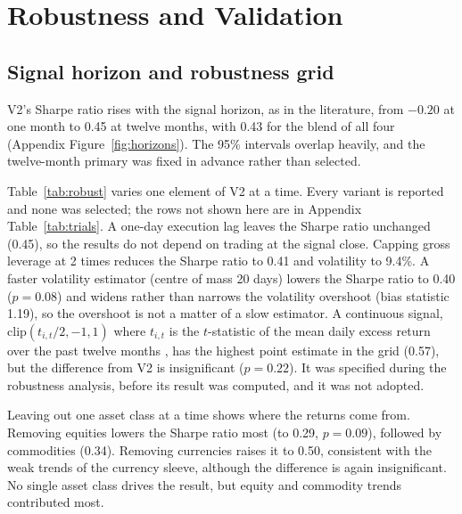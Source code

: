 \documentclass[11pt,a4paper]{article}
\begin{document}
\FloatBarrier
\section{Robustness and Validation}
\label{sec:robust}

\subsection{Signal horizon and robustness grid}

V2's Sharpe ratio rises with the signal horizon, as in the literature, from $-0.20$ at one month to 0.45 at twelve months, with 0.43 for the blend of all four (Appendix Figure~\ref{fig:horizons}). The 95\% intervals overlap heavily, and the twelve-month primary was fixed in advance rather than selected.

Table~\ref{tab:robust} varies one element of V2 at a time. Every variant is reported and none was selected; the rows not shown here are in Appendix Table~\ref{tab:trials}. A one-day execution lag leaves the Sharpe ratio unchanged (0.45), so the results do not depend on trading at the signal close. Capping gross leverage at 2 times reduces the Sharpe ratio to 0.41 and volatility to 9.4\%. A faster volatility estimator (centre of mass 20 days) lowers the Sharpe ratio to 0.40 ($p = 0.08$) and widens rather than narrows the volatility overshoot (bias statistic 1.19), so the overshoot is not a matter of a slow estimator. A continuous signal, $\mathrm{clip}(t_{i,t}/2, -1, 1)$ where $t_{i,t}$ is the $t$-statistic of the mean daily excess return over the past twelve months \citep{baltas2013}, has the highest point estimate in the grid (0.57), but the difference from V2 is insignificant ($p = 0.22$). It was specified during the robustness analysis, before its result was computed, and it was not adopted.

\begin{table}[!htbp]
\centering
\caption{Robustness grid: V2 with one element changed. $\Delta$SR and $p$: Sharpe difference from V2 and bootstrap $p$-value. Corr.: correlation with V2. Vol and MDD in \%. Vol bias: bias statistic of the variant's own ex-ante volatility forecast. All net of 10 bps.}
\label{tab:robust}
\small

\end{table}

Leaving out one asset class at a time shows where the returns come from. Removing equities lowers the Sharpe ratio most (to 0.29, $p = 0.09$), followed by commodities (0.34). Removing currencies raises it to 0.50, consistent with the weak trends of the currency sleeve, although the difference is again insignificant. No single asset class drives the result, but equity and commodity trends contributed most.
\end{document}
